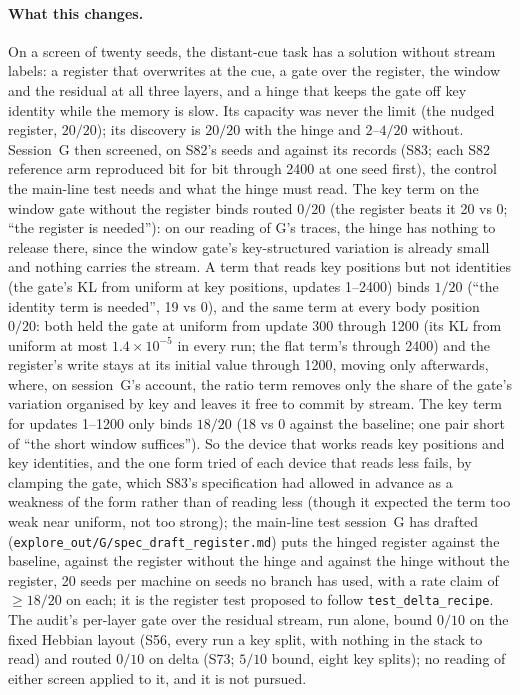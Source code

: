 \documentclass[11pt]{article}
\begin{document}
\paragraph{What this changes.} On a screen of twenty seeds, the distant-cue task has a solution without stream labels: a register that overwrites at the cue, a gate over the register, the window and the residual at all three layers, and a hinge that keeps the gate off key identity while the memory is slow. Its capacity was never the limit (the nudged register, $20/20$); its discovery is $20/20$ with the hinge and $2$--$4/20$ without. Session~G then screened, on S82's seeds and against its records (S83; each S82 reference arm reproduced bit for bit through 2400 at one seed first), the control the main-line test needs and what the hinge must read. The key term on the window gate without the register binds routed $0/20$ (the register beats it 20 vs 0; ``the register is needed''): on our reading of G's traces, the hinge has nothing to release there, since the window gate's key-structured variation is already small and nothing carries the stream. A term that reads key positions but not identities (the gate's KL from uniform at key positions, updates 1--2400) binds $1/20$ (``the identity term is needed'', 19 vs 0), and the same term at every body position $0/20$: both held the gate at uniform from update 300 through 1200 (its KL from uniform at most $1.4\times10^{-5}$ in every run; the flat term's through 2400) and the register's write stays at its initial value through 1200, moving only afterwards, where, on session~G's account, the ratio term removes only the share of the gate's variation organised by key and leaves it free to commit by stream. The key term for updates 1--1200 only binds $18/20$ (18 vs 0 against the baseline; one pair short of ``the short window suffices''). So the device that works reads key positions and key identities, and the one form tried of each device that reads less fails, by clamping the gate, which S83's specification had allowed in advance as a weakness of the form rather than of reading less (though it expected the term too weak near uniform, not too strong); the main-line test session~G has drafted (\texttt{explore\_out/G/spec\_draft\_register.md}) puts the hinged register against the baseline, against the register without the hinge and against the hinge without the register, 20 seeds per machine on seeds no branch has used, with a rate claim of $\geq 18/20$ on each; it is the register test proposed to follow \texttt{test\_delta\_recipe}. The audit's per-layer gate over the residual stream, run alone, bound $0/10$ on the fixed Hebbian layout (S56, every run a key split, with nothing in the stack to read) and routed $0/10$ on delta (S73; $5/10$ bound, eight key splits); no reading of either screen applied to it, and it is not pursued.
\end{document}
